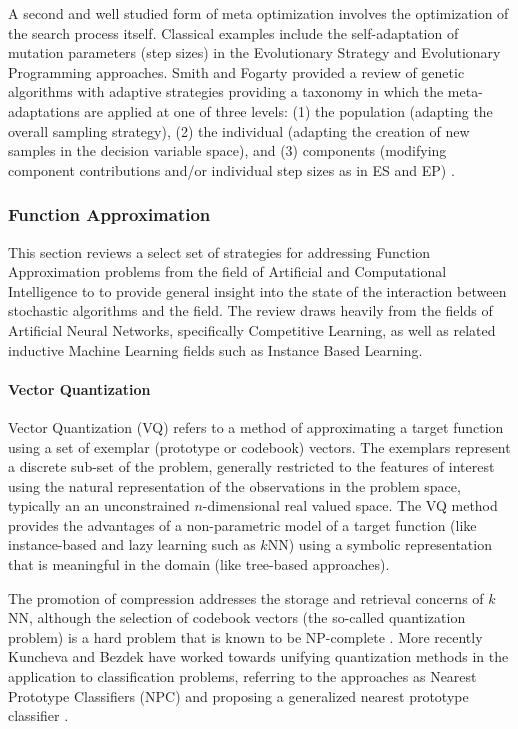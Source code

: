 A second and well studied form of meta optimization involves the optimization of the search process itself. Classical examples include the self-adaptation of mutation parameters (step sizes) in the Evolutionary Strategy and Evolutionary Programming approaches. Smith and Fogarty provided a review of genetic algorithms with adaptive strategies providing a taxonomy in which the meta-adaptations are applied at one of three levels: (1) the population (adapting the overall sampling strategy), (2) the individual (adapting the creation of new samples in the decision variable space), and (3) components (modifying component contributions and/or individual step sizes as in ES and EP) \cite{Smith1997b}.



%
%
\subsubsection{Function Approximation}
This section reviews a select set of strategies for addressing Function Approximation problems from the field of Artificial and Computational Intelligence to to provide general insight into the state of the interaction between stochastic algorithms and the field. The review draws heavily from the fields of Artificial Neural Networks, specifically Competitive Learning, as well as related inductive Machine Learning fields such as Instance Based Learning.

\paragraph{Vector Quantization}
Vector Quantization (VQ) refers to a method of approximating a target function using a set of exemplar (prototype or codebook) vectors. The exemplars represent a discrete sub-set of the problem, generally restricted to the features of interest using the natural representation of the observations in the problem space, typically an an unconstrained $n$-dimensional real valued space. The VQ method provides the advantages of a non-parametric model of a target function (like instance-based and lazy learning such as $k$NN) using a symbolic representation that is meaningful in the domain (like tree-based approaches). 

The promotion of compression addresses the storage and retrieval concerns of $k$NN, although the selection of codebook vectors (the so-called quantization problem) is a hard problem that is known to be NP-complete \cite{Garey1982}. More recently Kuncheva and Bezdek have worked towards unifying quantization methods in the application to classification problems, referring to the approaches as Nearest Prototype Classifiers (NPC) and proposing a generalized nearest prototype classifier \cite{Kuncheva1998, Kuncheva1998a}.
	
